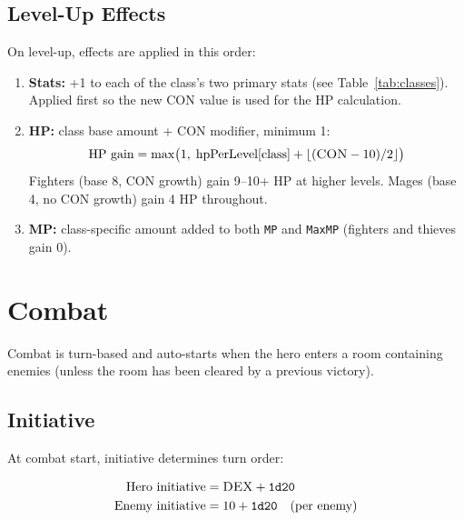 \documentclass[a4paper,10pt]{article}
\newcommand{\dice}[1]{\texttt{#1}}
\newcommand{\stat}[1]{\textsc{#1}}
\newcommand{\field}[1]{\texttt{#1}}
\begin{document}
\subsection{Level-Up Effects}

On level-up, effects are applied in this order:

\begin{enumerate}[nosep]
  \item \textbf{Stats:} +1 to each of the class's two primary stats
        (see Table~\ref{tab:classes}). Applied first so the new \stat{CON}
        value is used for the HP calculation.
  \item \textbf{HP:} class base amount + \stat{CON} modifier, minimum 1:
        \[
          \text{HP gain} = \max\!\big(1,\; \text{hpPerLevel}[\text{class}] + \lfloor(\stat{CON} - 10) / 2\rfloor\big)
        \]
        Fighters (base 8, CON growth) gain 9--10+ HP at higher levels.
        Mages (base 4, no CON growth) gain 4 HP throughout.
  \item \textbf{MP:} class-specific amount added to both \field{MP} and
        \field{MaxMP} (fighters and thieves gain 0).
\end{enumerate}

\section{Combat}

Combat is turn-based and auto-starts when the hero enters a room containing
enemies (unless the room has been cleared by a previous victory).

\subsection{Initiative}

At combat start, initiative determines turn order:

\begin{align}
  \text{Hero initiative}  &= \stat{DEX} + \dice{1d20} \\
  \text{Enemy initiative} &= 10 + \dice{1d20} \quad \text{(per enemy)}
\end{align}
\end{document}
